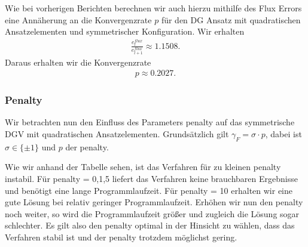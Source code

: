 Wie bei vorherigen Berichten berechnen wir auch hierzu mithilfe des Flux Errors eine Annäherung an die Konvergenzrate $p$ für den DG Ansatz mit quadratischen Ansatzelementen und symmetrischer Konfiguration.
Wir erhalten 
\begin{align*}
 \frac{e_l^{flux}}{e_{l+1}^{flux}} \approx 1.1508.
\end{align*}
Daraus erhalten wir die Konvergenzrate
\begin{align*}
  p \approx 0.2027.
\end{align*}

\subsubsection*{Penalty}
Wir betrachten nun den Einfluss des Parameters penalty auf das symmetrische DGV mit quadratischen Ansatzelementen.
Grundsätzlich gilt $ \gamma_F  = \sigma \cdot p$, dabei ist $\sigma \in \{ \pm 1 \} $ und $p$ der penalty.

\begin{figure}[H]
	\centering
\end{figure}

Wie wir anhand der Tabelle sehen, ist das Verfahren für zu kleinen penalty instabil. Für penalty = 0,1,5 liefert das Verfahren keine brauchbaren Ergebnisse und benötigt eine lange Programmlaufzeit.
Für penalty = 10 erhalten wir eine gute Lösung bei relativ geringer Programmlaufzeit. Erhöhen wir nun den penalty noch weiter, so wird die Programmlaufzeit größer und zugleich die Lösung sogar schlechter. Es gilt also den penalty optimal in der Hinsicht zu wählen, dass das Verfahren stabil ist und der penalty trotzdem möglichst gering.



